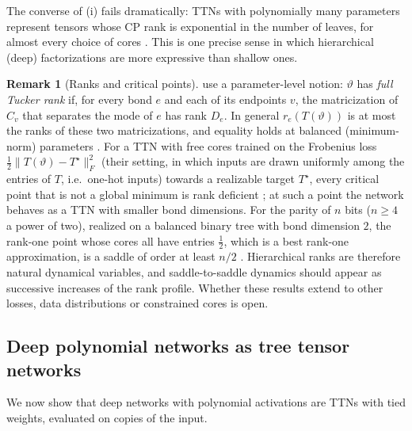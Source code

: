 \documentclass[11pt]{article}
\newcommand{\norm}[1]{\lVert #1\rVert}
\theoremstyle{definition}
\newtheorem{remark}[theorem]{Remark}
\numberwithin{equation}{section}
\begin{document}
The converse of (i) fails dramatically: TTNs with polynomially many parameters represent tensors whose CP rank is exponential in the number of leaves, for almost every choice of cores \citep{cohen2016expressive}. This is one precise sense in which hierarchical (deep) factorizations are more expressive than shallow ones.

\begin{remark}[Ranks and critical points]\label{rem:rank-critical}
\citet{furman2026benign} use a parameter-level notion: $\vartheta$ has \emph{full Tucker rank} if, for every bond $e$ and each of its endpoints $v$, the matricization of $C_v$ that separates the mode of $e$ has rank $D_e$. In general $r_e(T(\vartheta))$ is at most the ranks of these two matricizations, and equality holds at balanced (minimum-norm) parameters \citep[Proposition~D.2]{furman2026benign}. For a TTN with free cores trained on the Frobenius loss $\tfrac12\norm{T(\vartheta)-T^\star}_F^2$ (their setting, in which inputs are drawn uniformly among the entries of $T$, i.e.\ one-hot inputs) towards a realizable target $T^\star$, every critical point that is not a global minimum is rank deficient \citep[Theorem~5.2]{furman2026benign}; at such a point the network behaves as a TTN with smaller bond dimensions. For the parity of $n$ bits ($n\ge4$ a power of two), realized on a balanced binary tree with bond dimension $2$, the rank-one point whose cores all have entries $\tfrac12$, which is a best rank-one approximation, is a saddle of order at least $n/2$ \citep[Proposition~5.3]{furman2026benign}. Hierarchical ranks are therefore natural dynamical variables, and saddle-to-saddle dynamics should appear as successive increases of the rank profile. Whether these results extend to other losses, data distributions or constrained cores is open.
\end{remark}

\subsection{Deep polynomial networks as tree tensor networks}\label{sec:dpn}

We now show that deep networks with polynomial activations are TTNs with tied weights, evaluated on copies of the input.
\end{document}
